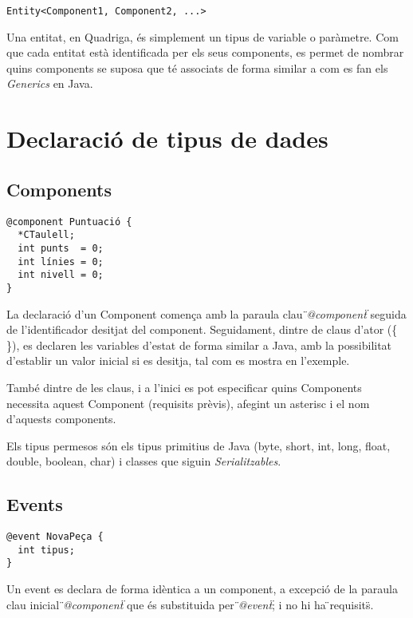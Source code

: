 \begin{verbatim}
Entity<Component1, Component2, ...>
\end{verbatim}

Una entitat, en Quadriga, és simplement un tipus de variable o paràmetre. Com que cada entitat està identificada per els seus components, es permet de nombrar quins components se suposa que té associats de forma similar a com es fan els {\em Generics} en Java.

\section{Declaració de tipus de dades}

\subsection{Components}

\begin{verbatim}
@component Puntuació {
  *CTaulell;
  int punts  = 0;
  int línies = 0;
  int nivell = 0;
}
\end{verbatim}

La declaració d'un Component comença amb la paraula clau {\em \"{}@component\"{}} seguida de l'identificador desitjat del component. Seguidament, dintre de claus d'ator (\{ \}), es declaren les variables d'estat de forma similar a Java, amb la possibilitat d'establir un valor inicial si es desitja, tal com es mostra en l'exemple.

També dintre de les claus, i a l'inici es pot especificar quins Components necessita aquest Component (requisits prèvis), afegint un asterisc {\bf *} i el nom d'aquests components.

Els tipus permesos són els tipus primitius de Java (byte, short, int, long, float, double, boolean, char) i classes que siguin {\em Serialitzables}.

\subsection{Events}

\begin{verbatim}
@event NovaPeça {
  int tipus;
}
\end{verbatim}

Un event es declara de forma idèntica a un component, a excepció de la paraula clau inicial {\em \"{}@component\"{}} que és substituida per {\em \"{}@event\"{}}; i no hi ha \"{}requisits\"{}.

